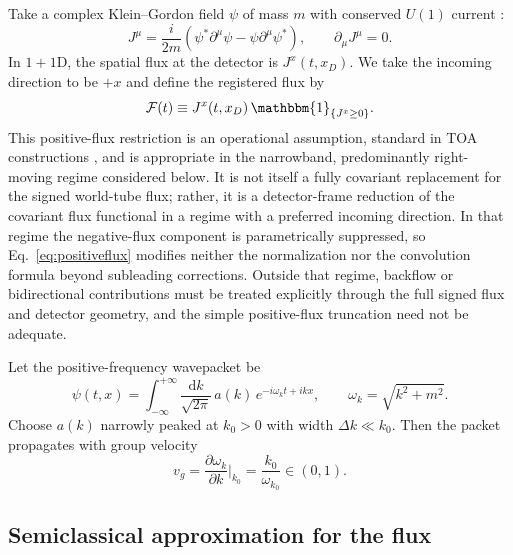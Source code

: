 \documentclass[pdflatex,sn-mathphys-num]{sn-jnl}
\theoremstyle{thmstylethree}
\theoremstyle{thmstyleone}
\theoremstyle{thmstyletwo}
\numberwithin{equation}{section}
\newcommand{\dd}{\mathrm{d}}
\newcommand{\F}{\mathcal{F}}
\begin{document}
        Take a complex Klein--Gordon field $\psi$ of mass $m$ with conserved $U(1)$ current \cite{Peskin1995,Weinberg1995}:
        \begin{equation}
            J^\mu = \frac{i}{2m}\left(\psi^\ast \partial^\mu \psi - \psi \partial^\mu \psi^\ast\right),
            \qquad \partial_\mu J^\mu = 0.
            \label{eq:KGcurrent}
        \end{equation}
        In $1+1$D, the spatial flux at the detector is $J^x(t,x_D)$. We take the incoming direction to be $+x$ and define the registered flux by
        \begin{equation}
            \F(t)\equiv J^x(t,x_D)\,\mathbbm{1}_{\{J^x\ge 0\}}.
            \label{eq:positiveflux}
        \end{equation}
        This positive-flux restriction is an operational assumption, standard in TOA constructions \cite{Kijowski1974,Giannitrapani1997,Muga2008}, and is appropriate in the narrowband, predominantly right-moving regime considered below. It is not itself a fully covariant replacement for the signed world-tube flux; rather, it is a detector-frame reduction of the covariant flux functional in a regime with a preferred incoming direction. In that regime the negative-flux component is parametrically suppressed, so Eq.~\eqref{eq:positiveflux} modifies neither the normalization nor the convolution formula beyond subleading corrections. Outside that regime, backflow or bidirectional contributions must be treated explicitly through the full signed flux and detector geometry, and the simple positive-flux truncation need not be adequate.
        
        Let the positive-frequency wavepacket be
        \begin{equation}
            \psi(t,x)=\int_{-\infty}^{+\infty}\frac{\dd k}{\sqrt{2\pi}}\,
            a(k)\,e^{-i\omega_k t + i k x},
            \qquad \omega_k=\sqrt{k^2+m^2}.
            \label{eq:wavepacket}
        \end{equation}
        Choose $a(k)$ narrowly peaked at $k_0>0$ with width $\Delta k\ll k_0$. Then the packet propagates with group velocity
        \begin{equation}
            v_g=\frac{\partial \omega_k}{\partial k}\Big|_{k_0}=\frac{k_0}{\omega_{k_0}}\in(0,1).
        \end{equation}
    
    \subsection{Semiclassical approximation for the flux}
        
\end{document}
